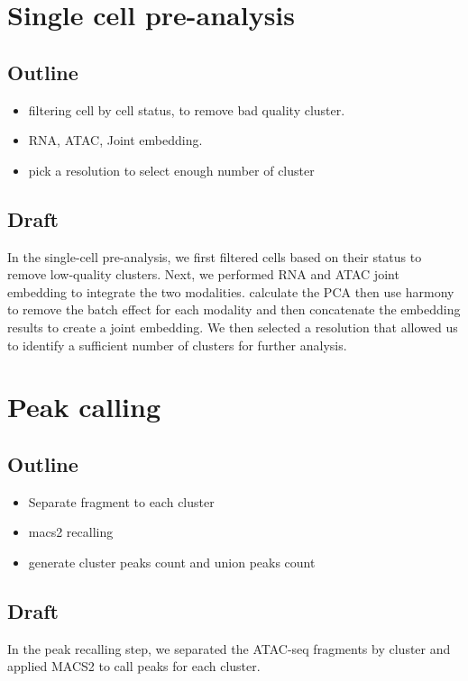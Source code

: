 \documentclass[11pt]{article}
\date{\today}
\title{}
\begin{document}
\tableofcontents

\section{Single cell pre-analysis}
\label{sec:org15330a9}
\subsection{Outline}
\label{sec:org66c1e9f}
\begin{itemize}
\item filtering cell by cell status, to remove bad quality cluster.
\item RNA, ATAC, Joint embedding.
\item pick a resolution to select enough number of cluster
\end{itemize}
\subsection{Draft}
\label{sec:org0eccdee}
In the single-cell pre-analysis, we first filtered cells based on their status to remove low-quality clusters.
Next, we performed RNA and ATAC joint embedding to integrate the two modalities. calculate the PCA then use harmony to remove the batch effect
for each modality and then concatenate the embedding results to create a joint embedding.
We then selected a resolution that allowed us to identify a sufficient number of clusters for further analysis.
\section{Peak calling}
\label{sec:org08ba434}
\subsection{Outline}
\label{sec:orga4354f3}
\begin{itemize}
\item Separate fragment to each cluster
\item macs2 recalling
\item generate cluster peaks count and union peaks count
\end{itemize}
\subsection{Draft}
\label{sec:org3bc4059}
In the peak recalling step, we separated the ATAC-seq fragments by cluster and applied MACS2 to call peaks for each cluster.
\end{document}
